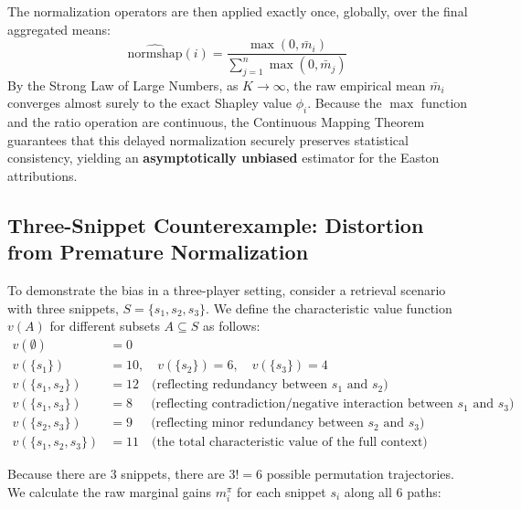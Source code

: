 \documentclass{article}
\begin{document}
The normalization operators are then applied exactly once, globally, over the final aggregated means:
$$ \widehat{\text{normshap}}(i) = \frac{\max(0, \bar{m}_i)}{\sum_{j=1}^n \max(0, \bar{m}_j)} $$
By the Strong Law of Large Numbers, as $K \to \infty$, the raw empirical mean $\bar{m}_i$ converges almost surely to the exact Shapley value $\phi_i$. Because the $\max$ function and the ratio operation are continuous, the Continuous Mapping Theorem guarantees that this delayed normalization securely preserves statistical consistency, yielding an \textbf{asymptotically unbiased} estimator for the Easton attributions.


\subsection{Three-Snippet Counterexample: Distortion from Premature Normalization}

To demonstrate the bias in a three-player setting, consider a retrieval scenario with three snippets, $S = \{s_1, s_2, s_3\}$. We define the characteristic value function $v(A)$ for different subsets $A \subseteq S$ as follows:
\begin{align*}
    v(\emptyset) &= 0 \\
    v(\{s_1\}) &= 10, \quad v(\{s_2\}) = 6, \quad v(\{s_3\}) = 4 \\
    v(\{s_1, s_2\}) &= 12 \quad \text{(reflecting redundancy between $s_1$ and $s_2$)} \\
    v(\{s_1, s_3\}) &= 8 \quad \ \ \text{(reflecting contradiction/negative interaction between $s_1$ and $s_3$)} \\
    v(\{s_2, s_3\}) &= 9 \quad \ \ \text{(reflecting minor redundancy between $s_2$ and $s_3$)} \\
    v(\{s_1, s_2, s_3\}) &= 11 \quad \text{(the total characteristic value of the full context)}
\end{align*}

Because there are $3$ snippets, there are $3! = 6$ possible permutation trajectories. We calculate the raw marginal gains $m_i^\pi$ for each snippet $s_i$ along all $6$ paths:
\end{document}
